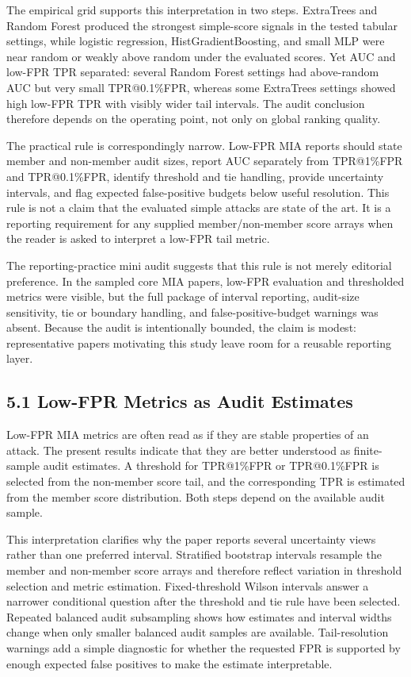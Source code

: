\documentclass[
  10pt,
  twocolumn]{article}
\begin{document}
The empirical grid supports this interpretation in two steps. ExtraTrees and Random Forest produced the strongest simple-score signals in the tested tabular settings, while logistic regression, HistGradientBoosting, and small MLP were near random or weakly above random under the evaluated scores. Yet AUC and low-FPR TPR separated: several Random Forest settings had above-random AUC but very small TPR@0.1\%FPR, whereas some ExtraTrees settings showed high low-FPR TPR with visibly wider tail intervals. The audit conclusion therefore depends on the operating point, not only on global ranking quality.

The practical rule is correspondingly narrow. Low-FPR MIA reports should state member and non-member audit sizes, report AUC separately from TPR@1\%FPR and TPR@0.1\%FPR, identify threshold and tie handling, provide uncertainty intervals, and flag expected false-positive budgets below useful resolution. This rule is not a claim that the evaluated simple attacks are state of the art. It is a reporting requirement for any supplied member/non-member score arrays when the reader is asked to interpret a low-FPR tail metric.

The reporting-practice mini audit suggests that this rule is not merely editorial preference. In the sampled core MIA papers, low-FPR evaluation and thresholded metrics were visible, but the full package of interval reporting, audit-size sensitivity, tie or boundary handling, and false-positive-budget warnings was absent. Because the audit is intentionally bounded, the claim is modest: representative papers motivating this study leave room for a reusable reporting layer.

\hypertarget{low-fpr-metrics-as-audit-estimates}{%
\subsection{5.1 Low-FPR Metrics as Audit Estimates}\label{low-fpr-metrics-as-audit-estimates}}

Low-FPR MIA metrics are often read as if they are stable properties of an attack. The present results indicate that they are better understood as finite-sample audit estimates. A threshold for TPR@1\%FPR or TPR@0.1\%FPR is selected from the non-member score tail, and the corresponding TPR is estimated from the member score distribution. Both steps depend on the available audit sample.

This interpretation clarifies why the paper reports several uncertainty views rather than one preferred interval. Stratified bootstrap intervals resample the member and non-member score arrays and therefore reflect variation in threshold selection and metric estimation. Fixed-threshold Wilson intervals answer a narrower conditional question after the threshold and tie rule have been selected. Repeated balanced audit subsampling shows how estimates and interval widths change when only smaller balanced audit samples are available. Tail-resolution warnings add a simple diagnostic for whether the requested FPR is supported by enough expected false positives to make the estimate interpretable.
\end{document}
